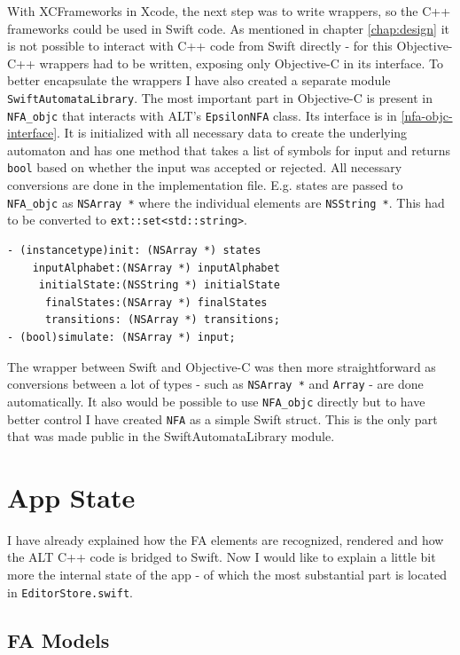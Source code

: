With XCFrameworks in Xcode, the next step was to write wrappers, so the C++ frameworks could be used in Swift code. As mentioned in chapter \ref{chap:design} it is not possible to interact with C++ code from Swift directly - for this Objective-C++ wrappers had to be written, exposing only Objective-C in its interface. To better encapsulate the wrappers I have also created a separate module \lstinline{SwiftAutomataLibrary}. The most important part in Objective-C is present in \lstinline{NFA_objc} that interacts with ALT's \lstinline{EpsilonNFA} class. Its interface is in \ref{nfa-objc-interface}. It is initialized with all necessary data to create the underlying automaton and has one method that takes a list of symbols for input and returns \lstinline{bool} based on whether the input was accepted or rejected. All necessary conversions are done in the implementation file. E.g. states are passed to \lstinline{NFA_objc} as \lstinline{NSArray *} where the individual elements are \lstinline{NSString *}. This had to be converted to \lstinline{ext::set<std::string>}.

\begin{lstlisting}[caption={NFA\_objc interface}, label=nfa-objc-interface]
- (instancetype)init: (NSArray *) states
    inputAlphabet:(NSArray *) inputAlphabet
     initialState:(NSString *) initialState
      finalStates:(NSArray *) finalStates
      transitions: (NSArray *) transitions;
- (bool)simulate: (NSArray *) input;
\end{lstlisting}

The wrapper between Swift and Objective-C was then more straightforward as conversions between a lot of types - such as \lstinline{NSArray *} and \lstinline{Array} - are done automatically. It also would be possible to use \lstinline{NFA_objc} directly but to have better control I have created \lstinline{NFA} as a simple Swift struct. This is the only part that was made public in the SwiftAutomataLibrary module.

\section{App State}

I have already explained how the FA elements are recognized, rendered and how the ALT C++ code is bridged to Swift. Now I would like to explain a little bit more the internal state of the app - of which the most substantial part is located in \lstinline{EditorStore.swift}.

\subsection{FA Models}

